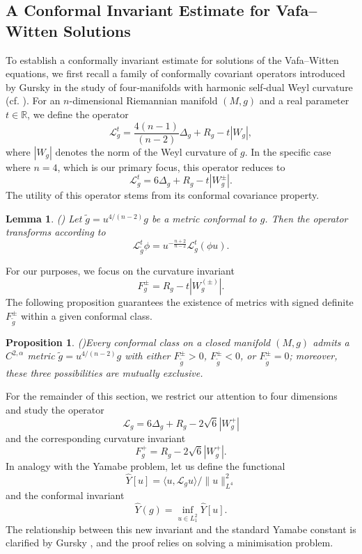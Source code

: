 \documentclass[12pt, twoside]{article}
\newtheorem{lemma}[theorem]{Lemma}
\newtheorem{proposition}[theorem]{Proposition}
\theoremstyle{definition}
\numberwithin{equation}{section}
\def \a {\alpha }
\def \De {\Delta}
\begin{document}
\subsection{A Conformal Invariant Estimate for Vafa--Witten Solutions}
To establish a conformally invariant estimate for solutions of the Vafa--Witten equations, 
we first recall a family of conformally covariant operators introduced by Gursky in the study of four‑manifolds with harmonic self‑dual Weyl curvature 
(cf. \cite{Gur00,Ito05}).  For an  $n$-dimensional Riemannian manifold $(M,g)$ and a real parameter  $t\in\mathbb{R}$, we define the operator 
\begin{equation}
\mathcal{L}^{t}_{g}=\frac{4(n-1)}{(n-2)}\De_{g}+R_{g}-t|W_{g}|,
\end{equation}
where $|W_{g}|$ denotes the norm of the Weyl curvature of $g$. In the specific case where $n=4$, which is our primary focus, this operator reduces to
\begin{equation}
\mathcal{L}^{t}_{g}=6\De_{g}+R_{g}-t|W^{\pm}_{g}|.
\end{equation}
The utility of this operator stems from its conformal covariance property.
\begin{lemma}(\cite[Lemma 3.1]{Gur00})
Let $\tilde{g}=u^{4/(n-2)}g$ be a metric conformal to $g$. Then the operator transforms according to
\begin{equation}
\mathcal{L}^{t}_{\tilde{g}}\phi=u^{-\frac{n+2}{n-2} }\mathcal{L}^{t}_{g}(\phi u).
\end{equation}
\end{lemma}
For our purposes, we focus on the curvature invariant
\begin{equation}
F_{g}^{\pm}=R_{g}-t|W^{(\pm)}_{g}|.
\end{equation}
The following proposition guarantees the existence of metrics with signed definite $F_{\tilde{g}}^{\pm}$ within a given conformal class.


\begin{proposition}(\cite[Proposition 3.2]{Gur00})\label{P1}
Every conformal class on a closed manifold $(M,g)$ admits a $C^{2,\a}$ metric $\tilde{g}=u^{4/(n-2)}g$ with either $F_{\tilde{g}}^{\pm}>0$, $F_{\tilde{g}}^{\pm}<0$, or $F_{\tilde{g}}^{\pm}=0$; moreover, these three possibilities are mutually exclusive.	
\end{proposition}
For the remainder of this section, we restrict our attention to four dimensions and study the operator 
\[\mathcal{L}_{g}=6\De_{g}+R_{g}-2\sqrt{6}|W^{+}_{g}|  \]
and the corresponding curvature invariant 
$$F^{+}_{g}=R_{g}-2\sqrt{6}|W^{+}_{g}|.$$
In analogy with the Yamabe problem, let us define the functional
\[\hat{Y}[u]=\langle u,\mathcal{L}_{g}u\rangle/\|u\|^{2}_{L^{4}} \]
and the conformal invariant 
\[\hat{Y}(g)=\inf_{u\in L^{2}_{1}}\hat{Y}[u]. \]
The relationship between this new invariant and the standard Yamabe constant is clarified by Gursky \cite[Proposition 3.5]{Gur00},
 and the proof relies on solving a minimisation problem. 
\end{document}
